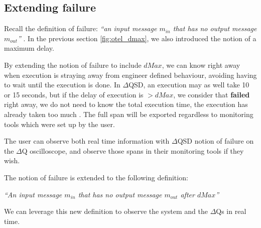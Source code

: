 \subsection{Extending failure}
   Recall the definition of failure: \textit{``an input message $m_{in}$ that has no output message $m_{out}$''} \cite{art}. In the previous section \ref{fig:otel_dmax}, we also introduced the notion of a maximum delay. 

   By extending the notion of failure to include $dMax$, we can know right away when execution is straying away from engineer defined behaviour, avoiding having to wait until the execution is done. In $\Delta$QSD, an execution may as well take 10 or 15 seconds, but if the delay of execution is $> dMax$, we consider that \textbf{failed} right away, we do not need to know the total execution time, the execution has already taken too much \cite{myo}. The full span will be exported regardless to monitoring tools which were set up by the user. 

   The user can observe both real time information with $\Delta$QSD notion of failure on the $\Delta$Q oscilloscope, and observe those spans in their monitoring tools if they wish.

The notion of failure is extended to the following definition:
        \begin{center}
            \textit{``An input message $m_{in}$ that has no output message $m_{out}$ after $dMax$''} 
        \end{center}
    We can leverage this new definition to observe the system and the $\Delta$Qs in real time.

